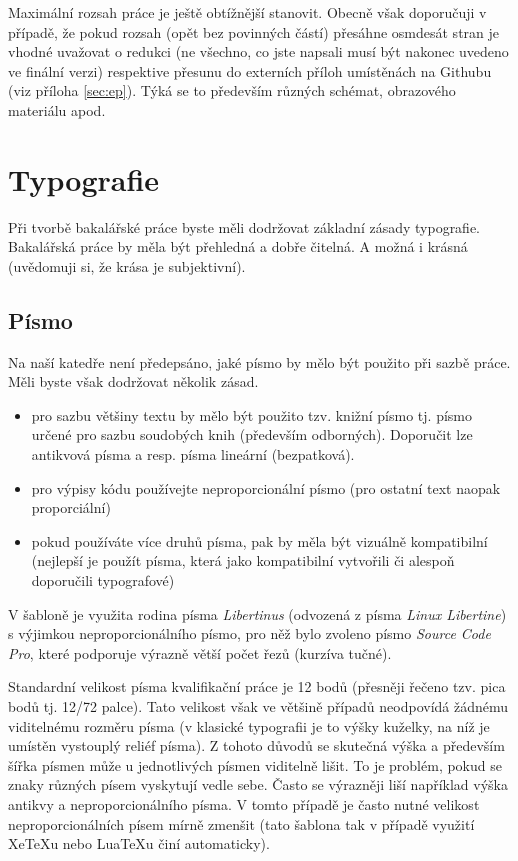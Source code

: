 \documentclass[male,czech]{kitheses}
\begin{document}
Maximální rozsah práce je ještě obtížnější stanovit. Obecně však doporučuji v případě, že pokud rozsah (opět bez povinných částí) přesáhne osmdesát stran je vhodné uvažovat o redukci (ne všechno, co jste napsali musí být nakonec uvedeno ve finální verzi) respektive přesunu do externích příloh umístěnách na Githubu (viz příloha \vref{sec:ep}). Týká se to především různých schémat, obrazového materiálu apod.

\chapter{Typografie}

Při tvorbě bakalářské práce byste měli dodržovat základní zásady typografie. Bakalářská práce by měla být přehledná a dobře čitelná. A možná i krásná (uvědomuji si, že krása je subjektivní).

\section{Písmo}

Na naší katedře není předepsáno, jaké písmo by mělo být použito při sazbě práce. Měli byste však dodržovat několik zásad.

\begin{itemize}
\item pro sazbu většiny textu by mělo být použito tzv. knižní písmo tj. písmo určené
pro sazbu soudobých knih (především odborných). Doporučit lze antikvová písma a resp. písma lineární (bezpatková).
\item pro výpisy kódu používejte neproporcionální písmo (pro ostatní text naopak proporciální)
\item pokud používáte více druhů písma, pak by měla být vizuálně kompatibilní (nejlepší je použít písma, která jako kompatibilní vytvořili či alespoň doporučili typografové)
\end{itemize}

V šabloně je využita rodina písma \textit{Libertinus} (odvozená z písma \textit{Linux Libertine}) s výjimkou neproporcionálního písmo, pro něž bylo zvoleno písmo \textit{Source Code Pro}, které podporuje výrazně větší počet řezů (kurzíva tučné).

Standardní velikost písma kvalifikační práce je 12 bodů (přesněji řečeno tzv. pica bodů tj. 12/72 palce). Tato velikost však ve většině případů neodpovídá žádnému viditelnému rozměru písma (v klasické typografii je to výšky kuželky, na níž je umístěn vystouplý reliéf písma). Z  tohoto důvodů se skutečná výška a především šířka písmen může u jednotlivých písmen viditelně lišit. To je problém, pokud se znaky různých písem vyskytují vedle sebe. Často se výrazněji liší například výška antikvy a  neproporcionálního písma. V tomto případě je často nutné velikost neproporcionálních písem mírně zmenšit (tato šablona tak v případě využití XeTeXu nebo LuaTeXu činí automaticky).
\end{document}
